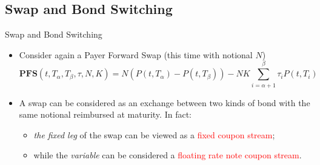 \documentclass{beamer}
\begin{document}
\subsection{Swap and Bond Switching}
\begin{frame}{Swap and Bond Switching}
	\begin{itemize}
		\item<1-> Consider again a Payer Forward Swap (this time with notional $N$)
		\begin{equation*}
			\textbf{PFS}(t,T_\alpha,T_\beta,\tau,N,K)=N(P(t,T_\alpha)-P(t,T_\beta))-NK\sum_{i=\alpha+1}^{\beta} \tau_iP(t,T_i)
		\end{equation*}
		\item<2-> A swap can be considered as an exchange between two kinds of bond with the same notional reimbursed at maturity. In fact:
		\begin{itemize}
		 \item<3->\emph{the fixed leg} of the swap can be viewed as a \textcolor{red}{fixed coupon stream};
		 \item<4-> while the \emph{variable} can be considered a \textcolor{red}{floating rate note coupon stream}. 
		\end{itemize}
	\end{itemize}
\end{frame}
\end{document}
